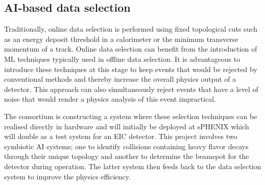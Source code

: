 \subsection{AI-based data selection}

Traditionally, online data selection is performed using fixed topological cuts such as an energy deposit threshold in a calorimeter or the minimum transverse momentum of a track. Online data selection can benefit from the introduction of ML techniques typically used in offline data selection. It is advantageous to introduce these techniques at this stage to keep events that would be rejected by conventional methods and thereby increase the overall physics output of a detector. This approach can also simultaneously reject events that have a level of noise that would render a physics analysis of this event impractical.

The consortium is constructing a system where these selection techniques can be realised directly in hardware and will initially be deployed at sPHENIX which will double as a test system for an EIC detector. This project involves two symbiotic AI systems; one to identify collisions containing heavy flavor decays through their unique topology and another to determine the beamspot for the detector during operation. The latter system then feeds back to the data selection system to improve the physics efficiency.



